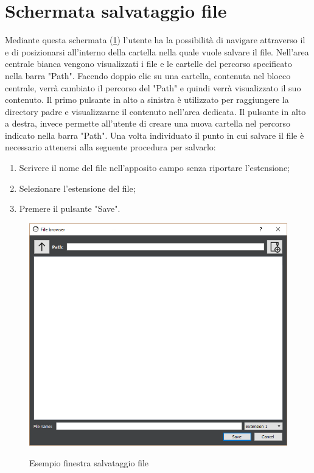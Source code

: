 \documentclass[../AnalisideiRequisiti.tex]{subfiles}
\begin{document}
	\section{Schermata salvataggio file}
	
	
		Mediante questa schermata (\ref{fig:filebrowser-save}) l'utente ha la possibilità di navigare attraverso il  e di posizionarsi all'interno della cartella nella quale vuole salvare il file.
		Nell'area centrale bianca vengono visualizzati i file e le cartelle del percorso specificato nella barra "Path". Facendo doppio clic su una cartella, contenuta nel blocco centrale, verrà cambiato il percorso del "Path" e quindi verrà visualizzato il suo contenuto.
		Il primo pulsante in alto a sinistra è utilizzato per raggiungere la directory padre e visualizzarne il contenuto nell'area dedicata.
		Il pulsante in alto a destra, invece permette all'utente di creare una nuova cartella nel percorso indicato nella barra "Path". 
		Una volta individuato il punto in cui salvare il file è necessario attenersi alla seguente procedura per salvarlo:
		\begin{enumerate}
			\item{} Scrivere il nome del file nell'apposito campo senza riportare l'estensione;
			\item{} Selezionare l'estensione del file;
			\item{} Premere il pulsante "Save".
		\end{enumerate}
	\begin{figure}[htp]
			\caption{Esempio finestra salvataggio file}
			\centering
			\includegraphics[width=\textwidth]{../img/filebrowser-save.png}
			\label{fig:filebrowser-save}
		\end{figure}
\end{document}
